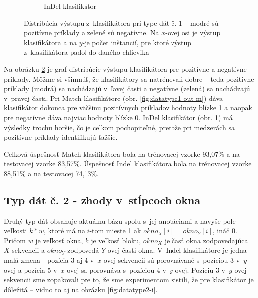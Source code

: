 \begin{figure}[htp]
\begin{subfigure}[t]{0.4\textwidth}
                \caption{InDel klasifikátor}
                \label{fig:datatype1-out-i}
        \end{subfigure}
        \caption[Distribúcia výstupu z~klasifikátora pri type dát č. 1]{Distribúcia výstupu z~klasifikátora pri type dát č. 1 -- modré sú pozitívne príklady a zelené sú negatívne. Na $x$-ovej osi je výstup klasifikátora a na $y$-je počet inštancií, pre ktoré výstup z~klasifikátora padol do daného chlievika}
        \label{fig:datatype1-out}
\end{figure}

Na obrázku \ref{fig:datatype1-out} je graf distribúcie výstupu klasifikátora pre pozitívne a negatívne príklady.
Môžme si všimnúť, že klasifikátory sa natrénovali dobre -- teda pozitívne príklady (modrá) sa nachádzajú v~ľavej časti a negatívne (zelená) sa nachádzajú v~pravej časti.
Pri Match klasifikátore (obr. \ref{fig:datatype1-out-m}) dáva klasifikátor dokonca pre väčšinu pozitívnych príkladov hodnoty blízke 1 a naopak pre negatívne dáva najviac hodnoty blízke 0.
InDel klasifikátor (obr. \ref{fig:datatype1-out-i}) má výsledky trochu horšie, čo je celkom pochopiteľné, pretože pri medzerách sa pozitívne príklady identifikujú ťažšie.

Celková úspešnosť Match klasifikátora bola na trénovacej vzorke 93,07\% a na testovacej vzorke 83,57\%.
Úspešnosť Indel klasifikátora bola na trénovacej vzorke 88,51\% a na testovacej 74,13\%.

\subsection{Typ dát č. 2 - zhody v~stĺpcoch okna}
\label{subsec:datatype2}

Druhý typ dát obsahuje aktuálnu bázu spolu s~jej anotáciami a navyše pole veľkosti $k*w$,
 ktoré má na $i$-tom mieste 1 ak $okno_X[i] = okno_Y[i]$, ináč 0.
 Pričom $w$ je veľkosť okna, $k$ je veľkosť bloku, $okno_X$ je časť okna zodpovedajúca $X$ sekvencii a $okno_Y$ zodpovedá $Y$-ovej časti okna.
V~Indel klasifikátore je jedna malá zmena - pozícia 3 aj 4 v~$x$-ovej sekvencii sú porovnávané s~pozíciou 3 v~$y$-ovej a pozícia 5 v~$x$-ovej sa porovnáva s~pozíciou 4 v~$y$-ovej.
Pozíciu 3 v~$y$-ovej sekvencii sme zopakovali pre to, že sme experimentom zistili, že pre klasifikátor je dôležitá -- vidno to aj na obrázku \ref{fig:datatype2-i}.

